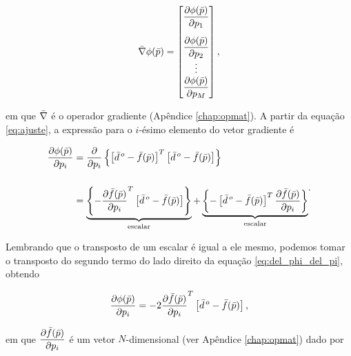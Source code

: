 \begin{equation}
\vect{\nabla} \phi(\vect{p}) =
    \begin{bmatrix}
        \dfrac{\partial \phi(\vect{p})}{\partial p_1} \vspace{0.3cm}\\
        \dfrac{\partial \phi(\vect{p})}{\partial p_2}\\
        \vdots \\
        \dfrac{\partial \phi(\vect{p})}{\partial p_M}
    \end{bmatrix} ,
\label{eq:gradphi_partial}
\end{equation} 

\noindent em que $\bar{\nabla}$ é o operador gradiente (Apêndice \ref{chap:opmat}).
A partir da equação \ref{eq:ajuste}, a expressão para o $i$-ésimo elemento do
vetor gradiente é

\begin{equation}
\begin{split}
\dfrac{\partial \phi(\bar{p})}{\partial p_i} &=
    \dfrac{\partial}{\partial p_i}\left\{
        \left[\bar{d}^{\thinspace o} - \bar{f}(\bar{p})\right]^T
        \left[\bar{d}^{\thinspace o} - \bar{f}(\bar{p})\right]
    \right\} \\[0.5cm]
    &= 
    \underbrace{
    \left\{-\dfrac{\partial\bar{f}(\bar{p})}{\partial p_i}^T
            \left[\bar{d}^{\thinspace o} - \bar{f}(\bar{p})\right]
    \right\}}_{\text{escalar}}
    +
    \underbrace{
    \left\{-\left[\bar{d}^{\thinspace o} - \bar{f}(\bar{p})\right]^T            
            \dfrac{\partial\bar{f}(\bar{p})}{\partial p_i}
    \right\}}_{\text{escalar}}
\end{split} .
\label{eq:del_phi_del_pi}
\end{equation}

\indent Lembrando que o transposto de um escalar é igual a ele mesmo, podemos
tomar o transposto do segundo termo do lado direito da equação
\ref{eq:del_phi_del_pi}, obtendo

\begin{equation}
\dfrac{\partial \phi(\bar{p})}{\partial p_i} = 
    -2\dfrac{\partial\bar{f}(\bar{p})}{\partial p_i}^T
    \left[\bar{d}^{\thinspace o} - \bar{f}(\bar{p})\right],
\label{eq:del_phi_del_pi_simple}
\end{equation}

\noindent em que $\dfrac{\partial\bar{f}(\bar{p})}{\partial p_i}$ é um vetor
$N$-dimensional (ver Apêndice \ref{chap:opmat}) dado por

